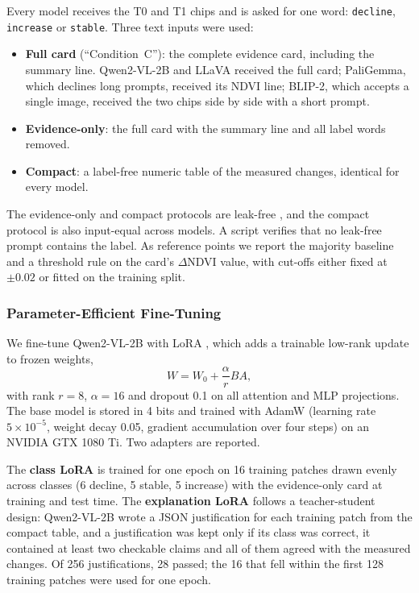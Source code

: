 \documentclass[11pt]{article}
\begin{document}
Every model receives the T0 and T1 chips and is asked for one word:
\texttt{decline}, \texttt{increase} or \texttt{stable}. Three text inputs
were used:
\begin{itemize}
\item \textbf{Full card} (``Condition~C''): the complete evidence card,
including the summary line. Qwen2-VL-2B and LLaVA received the full
card; PaliGemma, which declines long prompts, received its NDVI line;
BLIP-2, which accepts a single image, received the two chips side by
side with a short prompt.
\item \textbf{Evidence-only}: the full card with the summary line and
all label words removed.
\item \textbf{Compact}: a label-free numeric table of the measured
changes, identical for every model.
\end{itemize}
The evidence-only and compact protocols are leak-free \citep{kaufman2012}, and the compact
protocol is also input-equal across models. A script verifies that no
leak-free prompt contains the label. As reference points we report the
majority baseline and a threshold rule on the card's $\Delta$NDVI value,
with cut-offs either fixed at $\pm0.02$ or fitted on the training split.

\subsubsection{Parameter-Efficient Fine-Tuning}

We fine-tune Qwen2-VL-2B with LoRA \citep{hu2022lora}, which adds a
trainable low-rank update to frozen weights,
\begin{equation}
W = W_0 + \frac{\alpha}{r}BA,
\label{eq:lora}
\end{equation}
with rank $r=8$, $\alpha=16$ and dropout 0.1 on all attention and MLP
projections. The base model is stored in 4 bits
and trained with AdamW (learning rate
$5\times10^{-5}$, weight decay 0.05, gradient accumulation over four
steps) on an NVIDIA GTX 1080 Ti. Two adapters are reported.

The \textbf{class LoRA} is trained for one epoch on 16 training patches
drawn evenly across classes (6 decline, 5 stable, 5 increase) with the
evidence-only card at training and test time. The \textbf{explanation
LoRA} follows a teacher-student design: Qwen2-VL-2B wrote a JSON
justification for each training patch from the compact table, and a
justification was kept only if its class was correct, it contained at
least two checkable claims and all of them agreed with the measured
changes. Of 256 justifications, 28 passed; the 16 that fell within the
first 128 training patches were used for one epoch.
\end{document}
